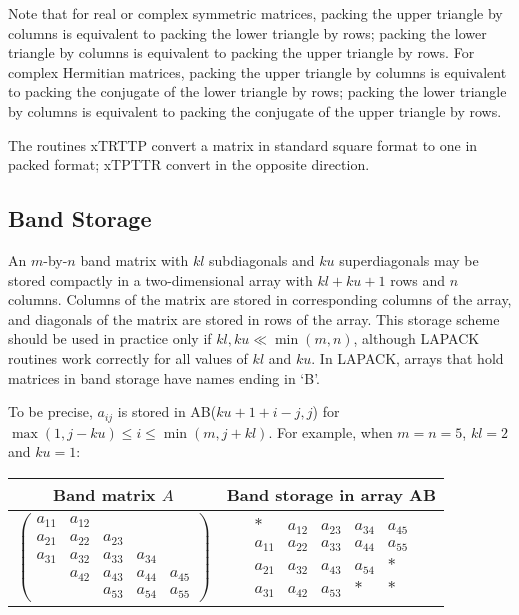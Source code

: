 Note that for real or complex symmetric matrices, 
packing the upper triangle
by columns is equivalent to packing the lower triangle by rows;
packing the lower triangle by columns is equivalent to packing
the upper triangle by rows. 
For complex Hermitian matrices,
packing the upper triangle
by columns is equivalent to packing the conjugate of the lower triangle by rows;
packing the lower triangle by columns is equivalent to packing
the conjugate of the upper triangle by rows.
 
The routines xTRTTP 
convert a matrix in standard square format to one in packed format;
xTPTTR convert in the opposite direction.

\subsection{Band Storage}\label{subsecband}

An $m$-by-$n$ band matrix with $kl$ subdiagonals
and $ku$ superdiagonals may be
stored compactly in a two-dimensional array with $kl+ku+1$ rows and $n$ columns.
Columns of the matrix are stored in corresponding columns of the
array, and diagonals of the matrix are stored in rows of the array.
This storage scheme should be used in practice only if $kl, ku \ll \min(m,n)$,
although LAPACK routines work correctly for all values of $kl$ and $ku$.
In LAPACK, arrays that hold matrices in band storage have names
ending in `B'.

To be precise, $a_{ij}$ is stored in AB($ku+1+i-j,j$) for
$\max(1,j-ku) \leq i \leq \min(m,j+kl)$.
For example, when $m = n = 5$, $kl = 2$ and $ku = 1$:

\begin{center}
\begin{tabular}{|c|c|} \hline
Band matrix $A$ & Band storage in array AB \\ \hline
$
\left( \begin{array}{ccccc}
a_{11} & a_{12} &        &        &        \\
a_{21} & a_{22} & a_{23} &        &        \\
a_{31} & a_{32} & a_{33} & a_{34} &        \\
       & a_{42} & a_{43} & a_{44} & a_{45} \\
       &        & a_{53} & a_{54} & a_{55} 
\end{array} \right)
$
&
$
\begin{array}{ccccc}
 \ast  & a_{12} & a_{23} & a_{34} & a_{45} \\
a_{11} & a_{22} & a_{33} & a_{44} & a_{55} \\
a_{21} & a_{32} & a_{43} & a_{54} &  \ast  \\
a_{31} & a_{42} & a_{53} &  \ast  &  \ast 
\end{array}
$
\\ \hline
\end{tabular}
\end{center}

